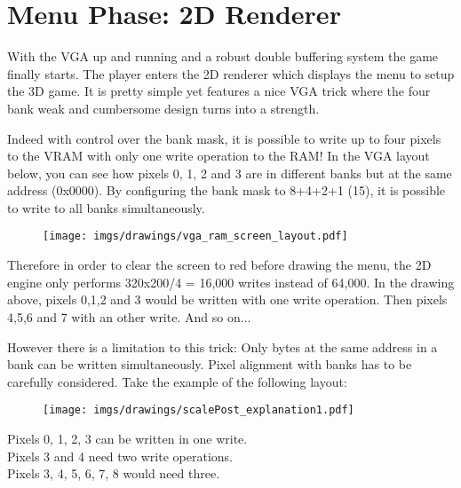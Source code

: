 \section{Menu Phase: 2D Renderer}
With the VGA up and running and a robust double buffering system the game finally starts. The player enters the 2D renderer which displays the menu to setup the 3D game. It is pretty simple yet features a nice VGA trick where the four bank weak and cumbersome design turns into a strength.
\par
\begin{figure}[H]
\centering
{}
\end{figure}
\par



Indeed with control over the bank mask, it is possible to write up to four pixels to the VRAM with only one write operation to the RAM! In the VGA layout below, you can see how pixels 0, 1, 2 and 3 are in different banks but at the same address (0x0000). By configuring the bank mask to 8+4+2+1 (15), it is possible to write to all banks simultaneously.\\
\par
\begin{figure}[H]
\centering
\texttt{[image: imgs/drawings/vga\_ram\_screen\_layout.pdf]}
\end{figure}

\par
Therefore in order to clear the screen to red before drawing the menu, the 2D engine only performs 320x200/4 = 16,000 writes instead of 64,000. In the drawing above, pixels 0,1,2 and 3 would be written with one write operation. Then pixels 4,5,6 and 7 with an other write. And so on...\\

\par
\begin{minipage}{\textwidth}

\end{minipage}
However there is a limitation to this trick: Only bytes at the same address in a bank can be written simultaneously. Pixel alignment with banks has to be carefully considered. Take the example of the following layout:\\
\par
\begin{figure}[H]
\centering
 \texttt{[image: imgs/drawings/scalePost\_explanation1.pdf]}
 \end{figure}
Pixels 0, 1, 2, 3 can be written in one write.\\
Pixels 3 and 4 need two write operations.\\
Pixels 3, 4, 5, 6, 7, 8 would need three.\\


